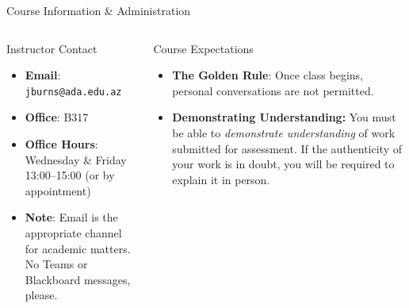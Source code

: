 \documentclass[aspectratio=169,11pt,t]{beamer}
\newcommand{\key}[1]{\textbf{#1}}
\newcommand{\code}[1]{\texttt{#1}}
\begin{document}
\begin{frame}{Course Information \& Administration}

\begin{columns}[T,onlytextwidth]

\begin{block}{Instructor Contact}
\begin{itemize}
  \item \key{Email}:
        \code{jburns@ada.edu.az}
  \item \key{Office}:
        B317
  \item \key{Office Hours}:
        Wednesday \& Friday 13:00--15:00
        (or by appointment)  
  \item \key{Note}:
        Email is the appropriate 
        channel for academic matters. No
        Teams or Blackboard messages, please.
\end{itemize}
\end{block}


\begin{block}{Course Expectations}

\begin{itemize}
  \item \key{The Golden Rule}:
  Once class begins, personal 
  conversations are not permitted.
  \item \key{Demonstrating Understanding:} You must 
  be able to \emph{demonstrate understanding} of 
  work submitted for assessment. If the 
  authenticity of your work is in doubt, you 
  will be required to explain it in person.
\end{itemize}

\end{block}

\end{columns}

\end{frame}





\end{document}
